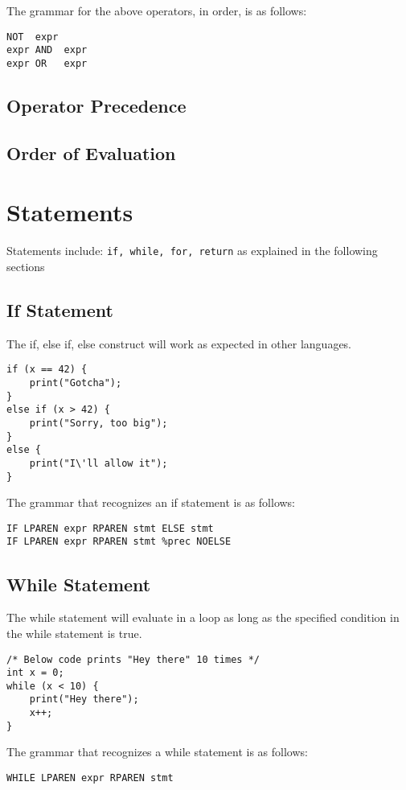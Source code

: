 \documentclass{article}
\begin{document}
The grammar for the above operators, in order, is as follows:
\begin{Verbatim}[frame=single]
NOT  expr
expr AND  expr
expr OR   expr
\end{Verbatim}

\subsection{Operator Precedence}

\subsection{Order of Evaluation}

\section{Statements}
Statements include: \texttt{if, while, for, return} as explained in the following sections

\subsection{If Statement}
The if, else if, else construct will work as expected in other languages.

\begin{lstlisting}
if (x == 42) {
	print("Gotcha");
}
else if (x > 42) {
	print("Sorry, too big");
}
else {
	print("I\'ll allow it");
}
\end{lstlisting}

The grammar that recognizes an if statement is as follows:
\begin{Verbatim}[frame=single]
IF LPAREN expr RPAREN stmt ELSE stmt
IF LPAREN expr RPAREN stmt %prec NOELSE
\end{Verbatim}

\subsection{While Statement}
The while statement will evaluate in a loop as long as the specified condition in the while statement is true.

\begin{lstlisting}
/* Below code prints "Hey there" 10 times */
int x = 0;
while (x < 10) {
	print("Hey there");
	x++;
}
\end{lstlisting}

The grammar that recognizes a while statement is as follows:
\begin{Verbatim}[frame=single]
WHILE LPAREN expr RPAREN stmt
\end{Verbatim}
\end{document}
